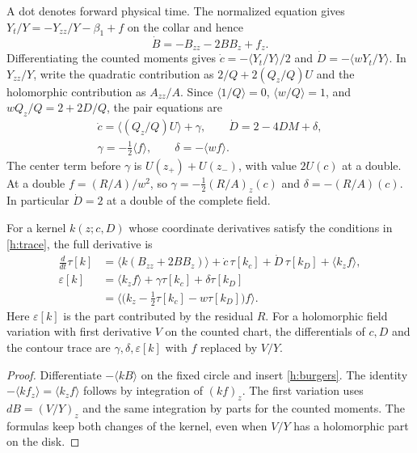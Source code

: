 A dot denotes forward physical time. The normalized equation gives
\(Y_t/Y=-Y_{zz}/Y-\beta_1+f\) on the collar and hence
\begin{equation}\label{h:burgers}
 \dot B=-B_{zz}-2BB_z+f_z .
\end{equation}
Differentiating the counted moments gives
\(\dot c=-\langle Y_t/Y\rangle/2\) and
\(\dot D=-\langle wY_t/Y\rangle\). In \(Y_{zz}/Y\), write the
quadratic contribution as \(2/Q+2(Q_z/Q)U\) and the holomorphic
contribution as \(A_{zz}/A\). Since
\(\langle1/Q\rangle=0\), \(\langle w/Q\rangle=1\), and
\(wQ_z/Q=2+2D/Q\), the pair equations are
\begin{equation}\label{h:pair}
 \begin{gathered}
 \dot c=\langle (Q_z/Q)U\rangle+\gamma,\qquad
 \dot D=2-4DM+\delta,\\
 \gamma=-\tfrac12\langle f\rangle,\qquad
 \delta=-\langle wf\rangle .
 \end{gathered}
\end{equation}
The center term before \(\gamma\) is \(U(z_+)+U(z_-)\), with value
\(2U(c)\) at a double. At a double \(f=(R/A)/w^2\), so
\(\gamma=-\tfrac12(R/A)_z(c)\) and \(\delta=-(R/A)(c)\).
In particular \(\dot D=2\) at a double of the complete field.

\begin{proposition}\label{h:forceprop}
For a kernel \(k(z;c,D)\) whose coordinate derivatives satisfy
the conditions in \eqref{h:trace}, the full derivative is
\begin{equation}\label{h:force}
 \begin{split}
 \frac{d}{dt}\tau[k]
   &=\langle k(B_{zz}+2BB_z)\rangle
               +\dot c\,\tau[k_c]+\dot D\,\tau[k_D]+\langle k_z f\rangle,\\
 \varepsilon[k]
   &=\langle k_z f\rangle+\gamma\tau[k_c]+\delta\tau[k_D]\\
   &=\big\langle\big(k_z-\tfrac12\tau[k_c]-w\tau[k_D]\big)f\big\rangle .
 \end{split}
\end{equation}
Here \(\varepsilon[k]\) is the part contributed by the residual
\(R\). For a holomorphic field variation with first derivative \(V\)
on the counted chart, the differentials of \(c,D\) and the contour
trace are \(\gamma,\delta,\varepsilon[k]\) with \(f\) replaced by \(V/Y\).
\end{proposition}
\begin{proof}
Differentiate \(-\langle kB\rangle\) on the fixed circle and insert
\eqref{h:burgers}. The identity
\(-\langle k f_z\rangle=\langle k_z f\rangle\) follows by
integration of \((kf)_z\). The first variation uses
\(dB=(V/Y)_z\) and the same integration by parts for the counted
moments. The formulas keep both changes of the kernel, even when
\(V/Y\) has a holomorphic part on the disk.
\end{proof}


